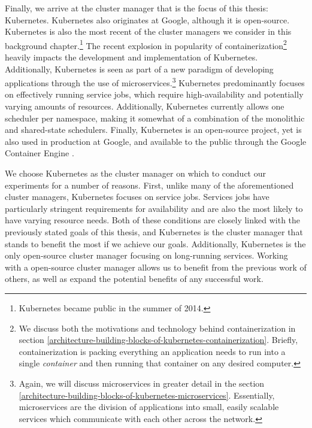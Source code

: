 Finally, we arrive at the cluster manager that is the focus of this thesis:
Kubernetes. Kubernetes also originates at Google, although it is open-source.
Kubernetes is also the most
recent of the cluster managers we consider in this background chapter.\footnote{Kubernetes
became public in the summer of 2014.} The recent
explosion in popularity of containerization\footnote{We discuss both the motivations and
technology behind containerization in section
\ref{architecture-building-blocks-of-kubernetes-containerization}. Briefly, containerization is
packing everything an application needs to run into a single \textit{container}
and then running that container on any desired computer.}
heavily impacts the development and implementation of Kubernetes. Additionally,
Kubernetes is seen as part of a new paradigm of developing applications
through the use of microservices.\footnote{Again, we will
discuss microservices in greater detail
in the section \ref{architecture-building-blocks-of-kubernetes-microservices}.
Essentially, microservices are the division of applications
into small, easily scalable services which communicate with each other across
the network.} Kubernetes predominantly focuses on effectively running service
jobs, which require high-availability and potentially varying amounts of resources.
Additionally, Kubernetes currently allows one scheduler per namespace, making it
somewhat of a combination of the monolithic and shared-state schedulers.
Finally, Kubernetes is an open-source project, yet is also used in production at
Google, and available to the public through the Google Container
Engine \cite{google-container-engine}.

We choose Kubernetes as the cluster manager on which to conduct our experiments
for a number of reasons. First, unlike many of the aforementioned cluster
managers, Kubernetes focuses on service jobs. Services jobs
have particularly stringent requirements for availability and are also the most
likely to have varying resource needs. Both of these conditions are closely linked
with the previously stated goals of this thesis, and Kubernetes is the cluster
manager that stands to benefit the most if we achieve our goals. Additionally,
Kubernetes is the only open-source cluster manager focusing on long-running
services. Working with a open-source cluster manager allows us to benefit from
the previous work of others, as well as expand the potential benefits of any
successful work.
